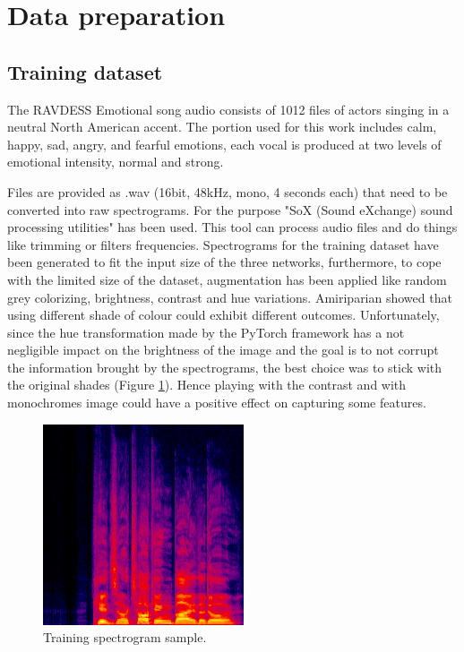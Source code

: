 \documentclass[10pt,twocolumn,letterpaper]{article}
\begin{document}
\section{Data preparation}\label{data-preparation}

\subsection{Training dataset}

The RAVDESS Emotional song audio consists of 1012 files of actors singing in a neutral North American accent. The portion used for this work includes calm, happy, sad, angry, and fearful emotions, each vocal is produced at two levels of emotional intensity, normal and strong.

Files are provided as .wav (16bit, 48kHz, mono, 4 seconds each) that need to be converted into raw spectrograms. For the purpose "SoX (Sound eXchange) sound processing utilities" has been used. This tool can process audio files and do things like trimming or filters frequencies. Spectrograms for the training dataset have been generated to fit the input size of the three networks, furthermore, to cope with the limited size of the dataset, augmentation has been applied like random grey colorizing, brightness, contrast and hue variations. Amiriparian \etal \cite{Amiriparian} showed that using different shade of colour could exhibit different outcomes. Unfortunately, since the hue transformation made by the PyTorch framework has a not negligible impact on the brightness of the image and the goal is to not corrupt the information brought by the spectrograms, the best choice was to stick with the original shades (Figure \ref{fig:training-sample}). Hence playing with the contrast and with monochromes image could have a positive effect on capturing some features.

\begin{figure}[t]
   \begin{center}
   \includegraphics[width=0.8\linewidth]{img/happy_92.png}
   \end{center}
      \caption{Training spectrogram sample.}
   \label{fig:training-sample}
   \end{figure}
\end{document}
